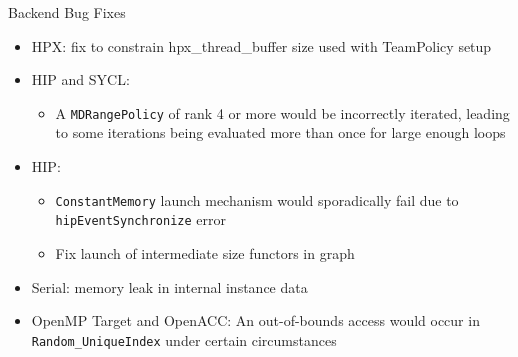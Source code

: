
\begin{frame}[fragile]{Backend Bug Fixes}
    \begin{itemize}
        \item HPX: fix to constrain hpx\_thread\_buffer size used with TeamPolicy setup %
        \item HIP and SYCL:
        \begin{itemize}
          \item A \texttt{MDRangePolicy} of rank 4 or more would be incorrectly iterated, leading to some iterations being evaluated more than once for large enough loops %
        \end{itemize}
        \item HIP:
        \begin{itemize}
          \item \texttt{ConstantMemory} launch mechanism would sporadically fail due to \texttt{hipEventSynchronize} error %
          \item Fix launch of intermediate size functors in graph %
        \end{itemize}
        \item Serial: memory leak in internal instance data %
        \item OpenMP Target and OpenACC: An out-of-bounds access would occur in \texttt{Random\_UniqueIndex} under certain circumstances %
    \end{itemize}
\end{frame}



